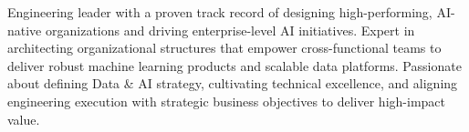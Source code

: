 

\begin{cvparagraph}

Engineering leader with a proven track record of designing high-performing, AI-native organizations and driving enterprise-level AI initiatives. Expert in architecting organizational structures that empower cross-functional teams to deliver robust machine learning products and scalable data platforms. Passionate about defining Data \& AI strategy, cultivating technical excellence, and aligning engineering execution with strategic business objectives to deliver high-impact value.
\end{cvparagraph}
